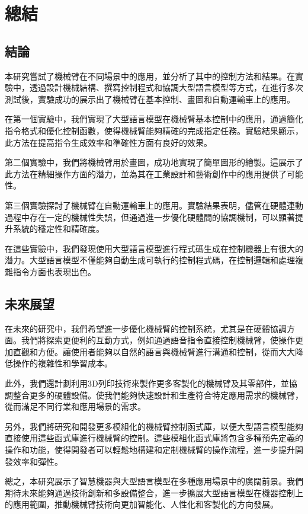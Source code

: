 \documentclass[class=NCU_thesis, crop=false]{standalone}
\begin{document}
\chapter{總結}

\section{結論}

本研究嘗試了機械臂在不同場景中的應用，並分析了其中的控制方法和結果。在實驗中，透過設計機械結構、撰寫控制程式和協調大型語言模型等方式，在進行多次測試後，實驗成功的展示出了機械臂在基本控制、畫圖和自動運輸車上的應用。

在第一個實驗中，我們實現了大型語言模型在機械臂基本控制中的應用，通過簡化指令格式和優化控制函數，使得機械臂能夠精確的完成指定任務。實驗結果顯示，此方法在提高指令生成效率和準確性方面有良好的效果。

第二個實驗中，我們將機械臂用於畫圖，成功地實現了簡單圖形的繪製。這展示了此方法在精細操作方面的潛力，並為其在工業設計和藝術創作中的應用提供了可能性。

第三個實驗探討了機械臂在自動運輸車上的應用。實驗結果表明，儘管在硬體連動過程中存在一定的機械性失誤，但通過進一步優化硬體間的協調機制，可以顯著提升系統的穩定性和精確度。

在這些實驗中，我們發現使用大型語言模型進行程式碼生成在控制機器上有很大的潛力。大型語言模型不僅能夠自動生成可執行的控制程式碼，在控制邏輯和處理複雜指令方面也表現出色。
\section{未來展望}

在未來的研究中，我們希望進一步優化機械臂的控制系統，尤其是在硬體協調方面。我們將探索更便利的互動方式，例如通過語音指令直接控制機械臂，使操作更加直觀和方便。讓使用者能夠以自然的語言與機械臂進行溝通和控制，從而大大降低操作的複雜性和學習成本。

此外，我們還計劃利用3D列印技術來製作更多客製化的機械臂及其零部件，並協調整合更多的硬體設備。使我們能夠快速設計和生產符合特定應用需求的機械臂，從而滿足不同行業和應用場景的需求。

另外，我們將研究和開發更多模組化的機械臂控制函式庫，以便大型語言模型能夠直接使用這些函式庫進行機械臂的控制。這些模組化函式庫將包含多種預先定義的操作和功能，使得開發者可以輕鬆地構建和定制機械臂的操作流程，進一步提升開發效率和彈性。

總之，本研究展示了智慧機器與大型語言模型在多種應用場景中的廣闊前景。我們期待未來能夠通過技術創新和多設備整合，進一步擴展大型語言模型在機器控制上的應用範圍，推動機械臂技術向更加智能化、人性化和客製化的方向發展。
\end{document}
